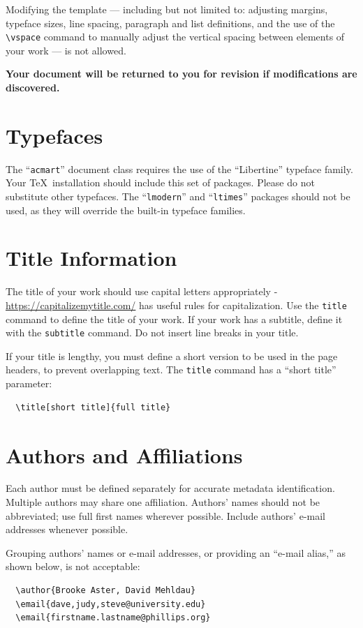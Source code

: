 \documentclass[sigconf, authordraft]{acmart}
\begin{document}
	Modifying the template --- including but not limited to: adjusting margins, typeface
	sizes, line spacing, paragraph and list definitions, and the use of the
	\verb|\vspace| command to manually adjust the vertical spacing between
	elements of your work --- is not allowed.

	{\bfseries Your document will be returned to you for revision if modifications are discovered.}

	\section{Typefaces}


	The ``\verb|acmart|'' document class requires the use of the ``Libertine'' typeface
	family. Your \TeX\ installation should include this set of packages. Please do
	not substitute other typefaces. The ``\verb|lmodern|'' and ``\verb|ltimes|''
	packages should not be used, as they will override the built-in typeface families.

	\section{Title Information}


	The title of your work should use capital letters appropriately - \url{https://capitalizemytitle.com/}
	has useful rules for capitalization. Use the {\verb|title|} command to define
	the title of your work. If your work has a subtitle, define it with the
	{\verb|subtitle|} command. Do not insert line breaks in your title.

	If your title is lengthy, you must define a short version to be used in the
	page headers, to prevent overlapping text. The \verb|title| command has a ``short
	title'' parameter: \begin{verbatim}
  \title[short title]{full title}
\end{verbatim}

	\section{Authors and Affiliations}


	Each author must be defined separately for accurate metadata identification. Multiple
	authors may share one affiliation. Authors' names should not be abbreviated;
	use full first names wherever possible. Include authors' e-mail addresses
	whenever possible.

	Grouping authors' names or e-mail addresses, or providing an ``e-mail alias,''
	as shown below, is not acceptable: \begin{verbatim}
  \author{Brooke Aster, David Mehldau}
  \email{dave,judy,steve@university.edu}
  \email{firstname.lastname@phillips.org}
\end{verbatim}
\end{document}
